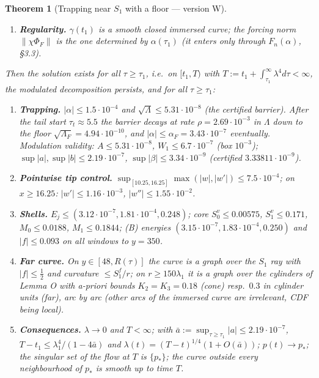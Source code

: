 \documentclass[11pt]{article}
\newtheorem{theorem}{Theorem}
\theoremstyle{definition}
\theoremstyle{remark}
\newcommand{\norm}[1]{\lVert #1\rVert}
\begin{document}
\begin{theorem}[Trapping near $S_1$ with a floor --- version W]
\begin{enumerate}[label=\textup{(H\arabic*)},leftmargin=*]
\item \textbf{Regularity.} $\gamma(t_1)$ is a smooth closed immersed curve; the forcing norm $\norm{\chi\Phi_F}$ is the one determined by $\alpha(\tau_1)$ (it enters only through $F_n(\alpha)$, \S3.3).
\end{enumerate}
Then the solution exists for all $\tau\ge\tau_1$, i.e.\ on $[t_1,T)$ with $T:=t_1+\int_{\tau_1}^\infty\lambda^4d\tau<\infty$, the modulated decomposition persists, and for all $\tau\ge\tau_1$:
\begin{enumerate}[label=\textup{(W\arabic*)},leftmargin=*]
\item \textbf{Trapping.} $|\alpha|\le1.5\cdot10^{-4}$ and $\sqrt\Lambda\le5.31\cdot10^{-8}$ (the certified barrier). After the tail start $\tau_t\approx5.5$ the barrier decays at rate $\rho=2.69\cdot10^{-3}$ in $\Lambda$ down to the floor $\sqrt{\Lambda_F}=4.94\cdot10^{-10}$, and $|\alpha|\le\alpha_F=3.43\cdot10^{-7}$ eventually. Modulation validity: $A\le5.31\cdot10^{-8}$, $W_1\le6.7\cdot10^{-7}$ (box $10^{-3}$); $\sup|a|,\sup|b|\le2.19\cdot10^{-7}$, $\sup|\beta|\le3.34\cdot10^{-9}$ (certified $3.33811\cdot10^{-9}$).
\item \textbf{Pointwise tip control.} $\sup_{[10.25,16.25]}\max(|w|,|w'|)\le7.5\cdot10^{-4}$; on $x\ge16.25$: $|w'|\le1.16\cdot10^{-3}$, $|w''|\le1.55\cdot10^{-2}$.
\item \textbf{Shells.} $E_j\le(3.12\cdot10^{-7},1.81\cdot10^{-4},0.248)$; core $S^v_0\le0.00575$, $S^v_1\le0.171$, $M_0\le0.0188$, $M_1\le0.1844$; (B) energies $(3.15\cdot10^{-7},1.83\cdot10^{-4},0.250)$ and $|f|\le0.093$ on all windows to $y=350$.
\item \textbf{Far curve.} On $y\in[48,R(\tau)]$ the curve is a graph over the $S_1$ ray with $|f|\le\tfrac12$ and curvature $\le S_1^f/r$; on $r\ge150\lambda_1$ it is a graph over the cylinders of Lemma O with a-priori bounds $K_2=K_3=0.18$ (cone) resp.\ $0.3$ in cylinder units (far), arc by arc (other arcs of the immersed curve are irrelevant, CDF being local).
\item \textbf{Consequences.} $\lambda\to0$ and $T<\infty$; with $\bar a:=\sup_{\tau\ge\tau_1}|a|\le2.19\cdot10^{-7}$, $T-t_1\le\lambda_1^4/(1-4\bar a)$ and $\lambda(t)=(T-t)^{1/4}(1+O(\bar a))$; $p(t)\to p_*$; the singular set of the flow at $T$ is $\{p_*\}$; the curve outside every neighbourhood of $p_*$ is smooth up to time $T$.
\end{enumerate}
\end{theorem}
\end{document}
